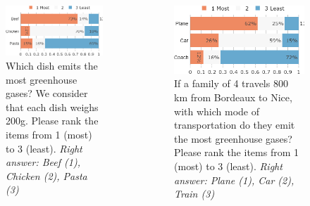 \begin{framefont}{\small}
\begin{frame}{}%
\begin{columns}
\begin{column}{0.5\textwidth}
\begin{figure}
\caption{Which dish emits the most greenhouse gases? We consider that each dish weighs 200g.
Please rank the items from 1 (most) to 3 (least).
\newline \footnotesize{\textit{Right answer: Beef (1), Chicken (2), Pasta (3)}}}
\includegraphics[width=.43\paperwidth]{../figures/FR/footprint_food_FR.png}
\end{figure}
\end{column}
\begin{column}{0.5\textwidth}
\begin{figure}
\caption{If a family of 4 travels 800 km from Bordeaux to Nice, with which mode of transportation do they emit the most greenhouse gases? 
Please rank the items from 1 (most) to 3 (least).
\newline \footnotesize{\textit{Right answer: Plane (1), Car (2), Train (3)}}} %
\includegraphics[width=.43\paperwidth]{../figures/FR/footprint_transport_FR.png}
\end{figure}
\end{column}
\end{columns}
\end{frame}


\end{framefont}
